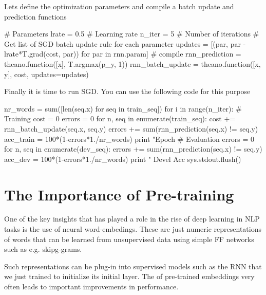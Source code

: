 \begin{exercise}
Lets define the optimization parameters and compile a batch update  and prediction functions
\begin{python}
# Parameters
lrate = 0.5   # Learning rate
n_iter = 5    # Number of iterations
# Get list of SGD batch update rule for each parameter
updates = [(par, par - lrate*T.grad(cost, par)) for par in rnn.param]
# compile
rnn_prediction = theano.function([x], T.argmax(p_y, 1))
rnn_batch_update = theano.function([x, y], cost, updates=updates)
\end{python}
Finally it is time to run SGD. You can use the following code for this purpose
\begin{python}
nr_words = sum([len(seq.x) for seq in train_seq])
for i in range(n_iter):
    # Training
    cost = 0
    errors = 0
    for n, seq in enumerate(train_seq):
        cost += rnn_batch_update(seq.x, seq.y)
        errors += sum(rnn_prediction(seq.x) != seq.y)
    acc_train = 100*(1-errors*1./nr_words) 
    print "Epoch %
    # Evaluation    
    errors = 0
    for n, seq in enumerate(dev_seq):
        errors += sum(rnn_prediction(seq.x) != seq.y)  
    acc_dev = 100*(1-errors*1./nr_words) 
    print " Devel Acc %
    sys.stdout.flush()
\end{python}


\end{exercise}


\section{The Importance of Pre-training}

One of the key insights that has played a role in the rise of deep learning in
NLP tasks is the use of neural word-embedings. These are just numeric 
representations of words that can be learned from unsupervised data using
simple FF networks such as e.g. skipg-grams.

Such representations can be plug-in into supervised models such as the RNN that we just
trained to initialize its initial layer. The of pre-trained embeddings very often leads to
important improvements in performance.

